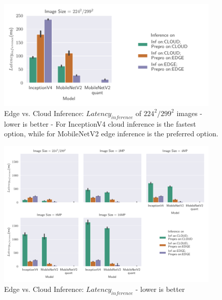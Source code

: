 \begin{figure}[!htb]
\centering
\includegraphics[width=0.95\textwidth]{./Bilder/single_plots/edge_vs_cloud_plots/Edge_vs_Cloud_Inference_Inference_Latencies_onlyNR.pdf}
\caption[Edge vs. Cloud Inference:  $Latency_{inference}$ of $224^2/299^2$ images - lower is better]{Edge vs. Cloud Inference:  $Latency_{inference}$ of $224^2/299^2$ images - lower is better - For InceptionV4 cloud inference is the fastest option, while for MobileNetV2 edge inference is the preferred option.}
\label{fig:EdgeVsCloudInferenceLatNR}
\end{figure}
\begin{figure}[!htb]
\centering
\includegraphics[width=0.95\textwidth]{./Bilder/single_plots/edge_vs_cloud_plots/Edge_vs_Cloud_Inference_Inference_Latencies.pdf}
\caption{Edge vs. Cloud Inference:  $Latency_{inference}$ - lower is better}
\label{fig:EdgeVsCloudInferenceLat}
\end{figure}

